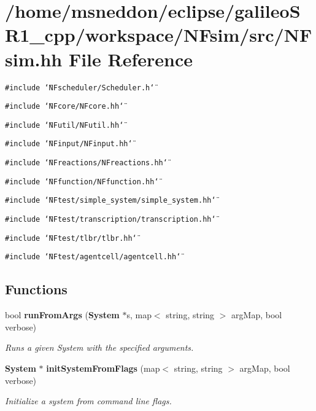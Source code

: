 \section{/home/msneddon/eclipse/galileoSR1\_\-cpp/workspace/NFsim/src/NFsim.hh File Reference}
\label{NFsim_8hh}


{\tt \#include \char`\"{}NFscheduler/Scheduler.h\char`\"{}}\par
{\tt \#include \char`\"{}NFcore/NFcore.hh\char`\"{}}\par
{\tt \#include \char`\"{}NFutil/NFutil.hh\char`\"{}}\par
{\tt \#include \char`\"{}NFinput/NFinput.hh\char`\"{}}\par
{\tt \#include \char`\"{}NFreactions/NFreactions.hh\char`\"{}}\par
{\tt \#include \char`\"{}NFfunction/NFfunction.hh\char`\"{}}\par
{\tt \#include \char`\"{}NFtest/simple\_\-system/simple\_\-system.hh\char`\"{}}\par
{\tt \#include \char`\"{}NFtest/transcription/transcription.hh\char`\"{}}\par
{\tt \#include \char`\"{}NFtest/tlbr/tlbr.hh\char`\"{}}\par
{\tt \#include \char`\"{}NFtest/agentcell/agentcell.hh\char`\"{}}\par
\subsection*{Functions}
\begin{CompactItemize}
\item 
bool {\bf runFromArgs} ({\bf System} $\ast$s, map$<$ string, string $>$ argMap, bool verbose)
\begin{CompactList}\small\item\em Runs a given System with the specified arguments. \item\end{CompactList}\item 
{\bf System} $\ast$ {\bf initSystemFromFlags} (map$<$ string, string $>$ argMap, bool verbose)
\begin{CompactList}\small\item\em Initialize a system from command line flags. \item\end{CompactList}\end{CompactItemize}


